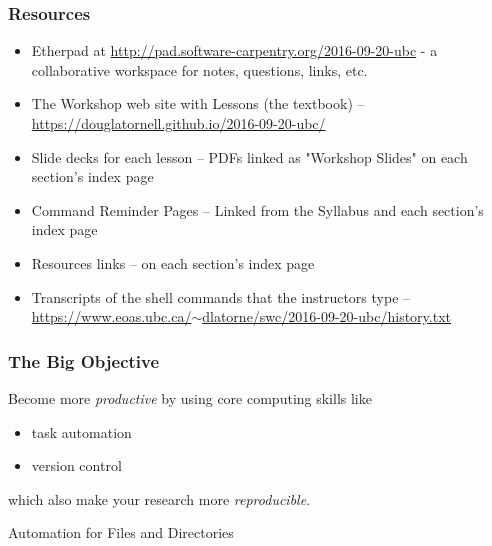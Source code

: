 \documentclass{beamer}
\begin{document}
\begin{frame}
  \frametitle{Resources}
  \begin{itemize}
    \item Etherpad at \href{http://pad.software-carpentry.org/2016-09-20-ubc}{http://pad.software-carpentry.org/2016-09-20-ubc} - a collaborative workspace for notes, questions, links, etc.
    \item The Workshop web site with Lessons (the textbook) -- \href{https://douglatornell.github.io/2016-09-20-ubc/}{https://douglatornell.github.io/2016-09-20-ubc/}
    \item Slide decks for each lesson -- PDFs linked as "Workshop Slides" on each section's index page
    \item Command Reminder Pages -- Linked from the Syllabus and each section's index page
    \item Resources links -- on each section's index page
    \item Transcripts of the shell commands that the instructors type -- \href{https://www.eoas.ubc.ca/~dlatorne/swc/2016-09-20-ubc/history.txt}{https://www.eoas.ubc.ca/$\sim$dlatorne/swc/2016-09-20-ubc/history.txt}
  \end{itemize}
\end{frame}


\begin{frame}
  \frametitle{The Big Objective}
  Become more {\em productive} by using core computing skills like
  \begin{itemize}
    \item task automation
    \item version control
  \end{itemize}
  which also make your research more {\em reproducible}.
\end{frame}


\begin{frame}
  \begin{block}{Automation for Files and Directories}
  \end{block}
\end{frame}
\end{document}
